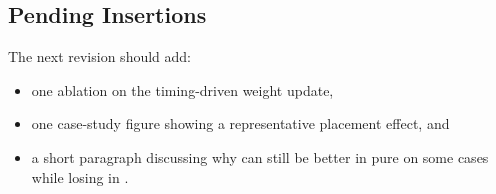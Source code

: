 \subsection{Pending Insertions}

The next revision should add:
\begin{itemize}[leftmargin=*,topsep=2pt,itemsep=2pt]
\item one ablation on the timing-driven weight update,
\item one case-study figure showing a representative placement effect, and
\item a short paragraph discussing why \rsad can still be better in pure \hpwl on some cases while losing in \fmax.
\end{itemize}
